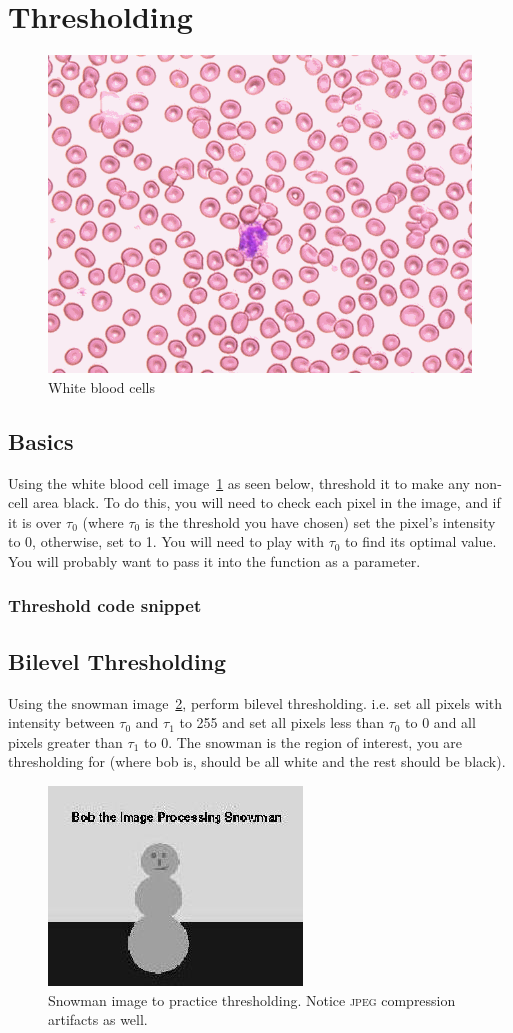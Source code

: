 \documentclass[a4paper]{article}
\newcommand{\code}[2]{
 \vspace{1em}
 \subsubsection*{#1}
 
}
\begin{document}
\section{Thresholding}

\begin{figure}
\centering
\includegraphics[width=0.5\linewidth]{figs/white_blood_cells.png}%
\caption{%
White blood cells
}\label{fig:img1}
\end{figure}

\subsection{Basics} Using the white blood cell image~\ref{fig:img1} as seen below, threshold it to make any
non-cell area black. To do this, you will need to check each pixel in the image,
and if it is over $\tau_0$ (where $\tau_0$ is the threshold you have chosen) set the pixel’s
intensity to 0, otherwise, set to 1. You will need to play with $\tau_0$ to find its
optimal value. You will probably want to pass it into the function as a
parameter.
\code{Threshold code snippet}{threshold-code.sci}
\subsection{Bilevel Thresholding}
Using the snowman image~\ref{fig:img2}, perform bilevel thresholding. i.e. set all
pixels with intensity between $\tau_0$ and $\tau_1$ to 255 and set all pixels
less than $\tau_0$ 
to 0 and all pixels greater than $\tau_1$ to 0. The snowman is the region of interest,
you are thresholding for (where bob is, should be all white and the rest should
be black).

\begin{figure}
\centering
\includegraphics[width=0.5\linewidth]{figs/snowman.jpg}%
\caption{%
Snowman image to practice thresholding. Notice \textsc{jpeg} compression artifacts as well.
}\label{fig:img2}
\end{figure}
\end{document}
